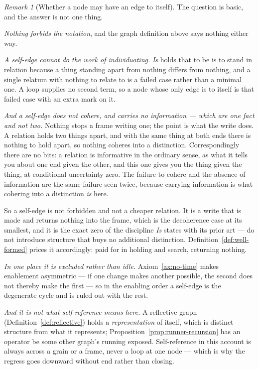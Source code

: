 \documentclass[11pt,a4paper]{article}
\theoremstyle{remark}\newtheorem{remark}[definition]{Remark}
\begin{document}
\begin{remark}[Whether a node may have an edge to itself]\label{rem:self-edge}
The question is basic, and the answer is not one thing.

\emph{Nothing forbids the notation}, and the graph definition above says nothing either way.

\emph{A self-edge cannot do the work of individuating.} \emph{Is} holds that to be is to stand in
relation because a thing standing apart from nothing differs from nothing, and a single relatum with
nothing to relate to is a failed case rather than a minimal one. A loop supplies no second term, so a
node whose only edge is to itself is that failed case with an extra mark on it.

\emph{And a self-edge does not cohere, and carries no information --- which are one fact and not two.}
Nothing stops a frame writing one; the point is what the write does. A relation holds two things apart,
and with the same thing at both ends there is nothing to hold apart, so nothing coheres into a
distinction. Correspondingly there are no bits: a relation is informative in the ordinary sense, as
what it tells you about one end given the other, and this one gives you the thing given the thing, at
conditional uncertainty zero. The failure to cohere and the absence of information are the same failure
seen twice, because carrying information is what cohering into a distinction \emph{is} here.

So a self-edge is not forbidden and not a cheaper relation. It is a write that is made and returns
nothing into the frame, which is the decoherence case at its smallest, and it is the exact zero of the
discipline \emph{Is} states with its prior art --- do not introduce structure that buys no
additional distinction. Definition~\ref{def:well-formed} prices it accordingly: paid for in holding and
search, returning nothing.

\emph{In one place it is excluded rather than idle.} Axiom~\ref{ax:no-time} makes enablement
asymmetric --- if one change makes another possible, the second does not thereby make the first --- so
in the enabling order a self-edge is the degenerate cycle and is ruled out with the rest.

\emph{And it is not what self-reference means here.} A reflective graph
(Definition~\ref{def:reflective}) holds a \emph{representation} of itself, which is distinct structure
from what it represents; Proposition~\ref{prop:runner-recursion} has an operator be some other graph's
running exposed. Self-reference in this account is always across a grain or a frame, never a loop at
one node --- which is why the regress goes downward without end rather than closing.


\end{remark}
\end{document}

